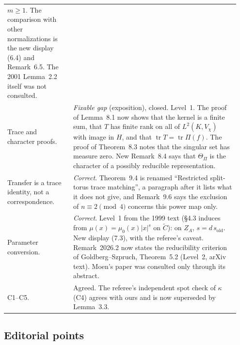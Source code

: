 \documentclass[12pt,letterpaper]{article}
\newcommand{\ZA}{Z_A}
\DeclareMathOperator{\tr}{tr}
\begin{document}
\begin{longtable}{@{}>{\raggedright\arraybackslash}p{0.27\linewidth}>{\raggedright\arraybackslash}p{0.68\linewidth}@{}}
$m\ge1$. The comparison with other normalizations is the new display
(6.4) and Remark~6.5. The 2001 Lemma~2.2 itself was not consulted.\\
1.5 Trace and character proofs. & \emph{Fixable gap} (exposition),
closed. Level~1. The proof of Lemma~8.1 now shows that the kernel is a
finite sum, that $T$ has finite rank on all of $L^2(K,V_\chi)$ with
image in $H$, and that $\tr T=\tr\Pi(f)$. The proof of Theorem~8.3 notes
that the singular set has measure zero. New Remark~8.4 says that
$\Theta_\Pi$ is the character of a possibly reducible representation.\\
1.6 Transfer is a trace identity, not a correspondence. & \emph{Correct}.
Theorem~9.4 is renamed ``Restricted split-torus trace matching'', a
paragraph after it lists what it does not give, and Remark~9.6 says the
exclusion of $n\equiv2\pmod4$ concerns this power map only.\\
1.7 Parameter conversion. & \emph{Correct}. Level~1 from the 1999 text
(\S4.3 induces from $\mu(x)=\mu_0(x)|x|^{s}$ on $\widetilde C$): on
$\ZA$, $s=d\,s_{\mathrm{old}}$. New display (7.3), with the referee's
caveat. Remark~2026.2 now states the reducibility criterion of
Goldberg--Szpruch, Theorem~5.2 (Level~2, arXiv text). Moen's paper was
consulted only through its abstract.\\
C1--C5. & Agreed. The referee's independent spot check of $\kappa$ (C4)
agrees with ours and is now superseded by Lemma~3.3.\\
\bottomrule
\end{longtable}

\subsection{Editorial points}
\end{document}

